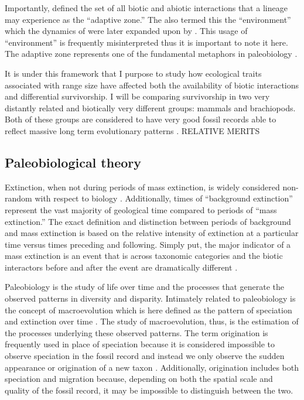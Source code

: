 \documentclass[12pt,letterpaper]{article}
\begin{document}
Importantly, \citet{Simpson1944} defined the set of all biotic and abiotic interactions that a lineage may experience as the ``adaptive zone.'' The also termed this the ``environment'' which the dynamics of were later expanded upon by \citet{VanValen1973}. This usage of ``environment'' is frequently misinterpreted thus it is important to note it here. The adaptive zone represents one of the fundamental metaphors in paleobiology \citep{Simpson1944,Simpson1953}. 

It is under this framework that I purpose to study how ecological traits associated with range size have affected both the availability of biotic interactions and differential survivorship. I will be comparing survivorship in two very distantly related and biotically very different groups: mammals and brachiopods. Both of these groups are considered to have very good fossil records able to reflect massive long term evolutionary patterns \citep{Mark1977}. RELATIVE MERITS



\subsection{Paleobiological theory}

Extinction, when not during periods of mass extinction, is widely considered non-random with respect to biology \citep{Jablonski1986}. Additionally, times of ``background extinction'' represent the vast majority of geological time compared to periods of ``mass extinction.'' The exact definition and distinction between periods of background and mass extinction is based on the relative intensity of extinction at a particular time versus times preceding and following. Simply put, the major indicator of a mass extinction is an event that is across taxonomic categories and the biotic interactors before and after the event are dramatically different \citet{Jablonski1986,Jablonski2005,Kitchell1986,Kitchell1991}.

Paleobiology is the study of life over time and the processes that generate the observed patterns in diversity and disparity. Intimately related to paleobiology is the concept of macroevolution which is here defined as the pattern of speciation and extinction over time \citep{Jablonski2008a}. The study of macroevolution, thus, is the estimation of the processes underlying these observed patterns. The term origination is frequently used in place of speciation because it is considered impossible to observe speciation in the fossil record and instead we only observe the sudden appearance or origination of a new taxon \citep{Coyne2004}. Additionally, origination includes both speciation and migration because, depending on both the spatial scale and quality of the fossil record, it may be impossible to distinguish between the two.
\end{document}
